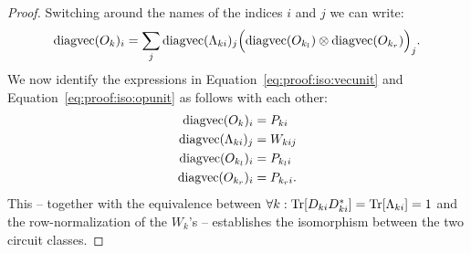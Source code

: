 \begin{proof}
	Switching around the names of the indices $i$ and $j$ we can write:
	\begin{align}
		\text{diagvec} (O_{k} )_i
		=
		\sum_j  \text{diagvec} ( \Lambda_{ki} )_j  \Bigl( \text{diagvec} (O_{k_l}) \otimes \text{diagvec} (O_{k_r}) \Bigr)_j.
		\label{eq:proof:iso:opunit}
	\end{align}
	We now identify the expressions in Equation~\ref{eq:proof:iso:vecunit} and Equation~\ref{eq:proof:iso:opunit} as follows with each other:
	\begin{align}
		\text{diagvec} (O_{k} )_i   & = P_{ki}
		\\
		\text{diagvec} (\Lambda_{ki} )_j    & = W_{kij}
		\\
		\text{diagvec} (O_{k_l} )_i & = P_{k_l i}
		\\
		\text{diagvec} (O_{k_r} )_i & = P_{k_r i}.
	\end{align}
	This -- together with the equivalence between $\forall k: \Tr [D_{ki}D^{*}_{ki}]= \Tr [\Lambda_{ki}] =1$ and the row-normalization of the $W_k$'s -- establishes the isomorphism between the two circuit classes.
\end{proof}















